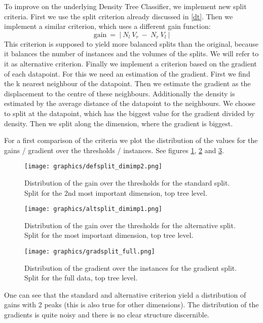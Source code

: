 \documentclass{article}
\begin{document}
To improve on the underlying Density Tree Classifier, we implement new split criteria.
First we use the split criterion already discussed in \ref{dt}. 
Then we implement a similar criterion, which uses a different gain function:
\begin{equation}
	\textrm{gain} ~  = ~ | ~ N_l ~ V_r ~ - ~ N_r ~ V_l ~ |
\end{equation}
This criterion is supposed to yield more balanced splits than the original, because it balances the 
number of instances and the volumes of the splits. We will refer to it as alternative criterion.
\newline
Finally we implement a criterion based on the gradient of each datapoint.
For this we need an estimation of the gradient. First we find the k nearest neighbour of
the datapoint. Then we estimate the gradient as the displacement to the centre of these neighbours.
Additionally the density is estimated by the average distance of the datapoint to the neighbours.
We choose to split at the datapoint, which has the biggest value for the gradient divided by density.
Then we split along the dimension, where the gradient is biggest.

For a first comparison of the criteria we plot the distribution of the values for the gains / gradient
over the thresholds / instances. See figures \ref{fig2a}, \ref{fig2b} and \ref{fig2c}.

\begin{figure}[h]
	\centering
	\texttt{[image: graphics/defsplit\_dimimp2.png]}
	\caption{Distribution of the gain over the thresholds for the standard split.
	Split for the 2nd most important dimension, top tree level.}
	\label{fig2a}
\end{figure}

\begin{figure}[h]
	\centering
	\texttt{[image: graphics/altsplit\_dimimp1.png]}
	\caption{Distribution of the gain over the thresholds for the alternative split.
	Split for the most important dimension, top tree level.}
	\label{fig2b}
\end{figure}

\begin{figure}[h]
	\centering
	\texttt{[image: graphics/gradsplit\_full.png]}
	\caption{Distribution of the gradient over the instances for the gradient split.
	Split for the full data, top tree level.}
	\label{fig2c}
\end{figure}

One can see that the standard and alternative criterion yield a distribution  
of gains with 2 peaks (this is also true for other dimensions).
The distribution of the gradients is quite noisy and there is no clear structure discernible.
\end{document}

